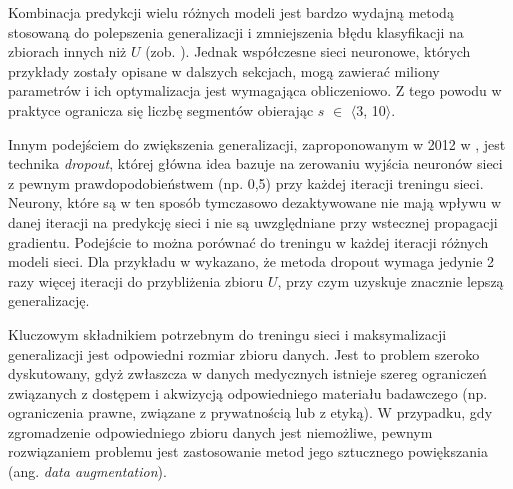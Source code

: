 Kombinacja predykcji wielu różnych modeli jest bardzo wydajną metodą stosowaną do polepszenia generalizacji i zmniejszenia błędu klasyfikacji na zbiorach innych niż $U$ (zob. \cite{Bell2007, Breiman2001}). Jednak współczesne sieci neuronowe, których przykłady zostały opisane w dalszych sekcjach, mogą zawierać miliony parametrów i ich optymalizacja jest wymagająca obliczeniowo. Z tego powodu w praktyce ogranicza się liczbę segmentów obierając $s$ $\in$ $\langle$3, 10$\rangle$.

Innym podejściem do zwiększenia generalizacji, zaproponowanym w 2012 w \cite{DBLP:journals/corr/abs-1207-0580}, jest technika \textit{dropout}, której główna idea bazuje na zerowaniu wyjścia neuronów sieci z pewnym prawdopodobieństwem (np. 0,5) przy każdej iteracji treningu sieci. Neurony, które są w ten sposób tymczasowo dezaktywowane nie mają wpływu w danej iteracji na predykcję sieci i nie są uwzględniane przy wstecznej propagacji gradientu. Podejście to można porównać do treningu w każdej iteracji różnych modeli sieci. Dla przykładu w \cite{Krizhevsky2012} wykazano, że metoda dropout wymaga jedynie 2 razy więcej iteracji do przybliżenia zbioru $U$, przy czym uzyskuje znacznie lepszą generalizację. 

Kluczowym składnikiem potrzebnym do treningu sieci i maksymalizacji generalizacji jest odpowiedni rozmiar zbioru danych. Jest to problem szeroko dyskutowany, gdyż zwłaszcza w danych medycznych istnieje szereg ograniczeń związanych z dostępem i akwizycją odpowiedniego materiału badawczego (np. ograniczenia prawne, związane z prywatnością lub z etyką). W przypadku, gdy zgromadzenie odpowiedniego zbioru danych jest niemożliwe, pewnym rozwiązaniem problemu jest zastosowanie metod jego sztucznego powiększania (ang. \textit{data augmentation}).

